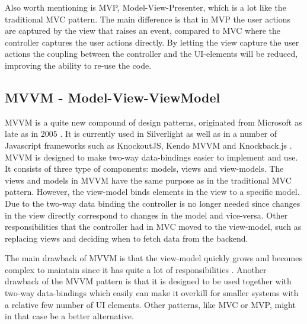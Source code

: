 Also worth mentioning is MVP, Model-View-Presenter, which is a lot like the traditional MVC pattern. The main difference is that in MVP the user actions are captured by the view that raises an event, compared to MVC where the controller captures the user actions directly. By letting the view capture the user actions the coupling between the controller and the UI-elements will be reduced, improving the ability to re-use the code.

\subsection{MVVM - Model-View-ViewModel}

MVVM is a quite new compound of design patterns, originated from Microsoft as late as in 2005 \cite{mvvm_history}. It is currently used in Silverlight as well as in a number of Javascript frameworks such as KnockoutJS, Kendo MVVM and Knockback.js \cite{mvvm_used}. MVVM is designed to make two-way data-bindings easier to implement and use. It consists of three type of components: models, views and view-models. The views and models in MVVM have the same purpose as in the traditional MVC pattern. However, the view-model binds elements in the view to a specific model. Due to the two-way data binding the controller is no longer needed since changes in the view directly correspond to changes in the model and vice-versa. Other responsibilities that the controller had in MVC moved to the view-model, such as replacing views and deciding when to fetch data from the backend.

The main drawback of MVVM is that the view-model quickly grows and becomes complex to maintain since it has quite a lot of responsibilities \cite{mvvm_drawbacks}. Another drawback of the MVVM pattern is that it is designed to be used together with two-way data-bindings which easily can make it overkill for smaller systems with a relative few number of UI elements. Other patterns, like MVC or MVP, might in that case be a better alternative.

